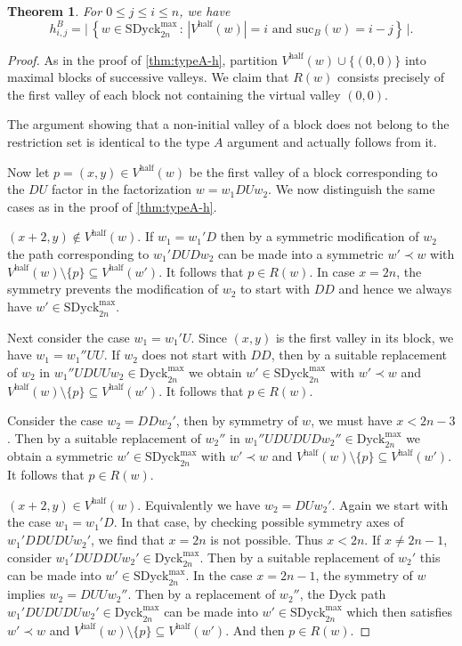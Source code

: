 \documentclass[11pt]{amsart}
\def\Dyck{\mathrm{Dyck}}
\def\half{\mathrm{half}}
\def\SDyck{\mathrm{SDyck}}
\def\suc{\mathrm{suc}}
\theoremstyle{plain}
\numberwithin{lemma}{\DefaultNumberTheoremWithin}
\newtheorem{theorem}{Theorem}
\numberwithin{theorem}{\DefaultNumberTheoremWithin}
\numberwithin{corollary}{\DefaultNumberTheoremWithin}
\numberwithin{proposition}{\DefaultNumberTheoremWithin}
\numberwithin{conjecture}{\DefaultNumberTheoremWithin}
\theoremstyle{definition}
\numberwithin{definition}{\DefaultNumberTheoremWithin}
\numberwithin{question}{\DefaultNumberTheoremWithin}
\numberwithin{problem}{\DefaultNumberTheoremWithin}
\theoremstyle{remark}
\numberwithin{remark}{\DefaultNumberTheoremWithin}
\numberwithin{example}{\DefaultNumberTheoremWithin}
\numberwithin{claim}{\DefaultNumberTheoremWithin}
\begin{document}
\begin{theorem}\label{thm:typeB-h}
For $0\leq j\leq i\leq n$, we have
\[
h^B_{i,j}
=
\Big|\,\left\{
w\in\SDyck_{2n}^{\max}
\,:\,
|V^{\half}(w)|=i \text{ and }
\suc_B(w)=i-j
\right\}\,\Big|.
\]
\end{theorem}

\begin{proof}
As in the proof of
\ref{thm:typeA-h}, partition
$V^{\half}(w)\cup\{(0,0)\}$
into maximal blocks of successive valleys. We claim that $R(w)$
consists precisely of the first valley of each block not containing
the virtual valley $(0,0)$.

The argument showing that a non-initial valley of a block
does not belong to the restriction set is identical to the  type
$A$ argument and actually follows from it. 

Now let $p = (x,y) \in V^ {\half}(w) $ be the first valley of a block corresponding to the $DU$ factor in the factorization 
$w = w_1DUw_2$. 
We now distinguish the same cases as in the proof of \ref{thm:typeA-h}.

\medskip

 $(x+2,y) \not \in V^{\half}(w)$.
If $w_1 = w_1'D$ then by a symmetric modification of $w_2$ the 
path corresponding to $w_1'DUDw_2$ can be made into a symmetric $w' \prec w$ with $V^{\half}(w)\setminus\{p\}
\subseteq V^{\half}(w')$. It follows that $p\in R(w)$. 
In case $x = 2n$, the symmetry prevents the modification of $w_2$ to start with $DD$ and hence we always have $w' \in \SDyck^{\max}_{2n}$. 

Next consider the case $w_1 = w_1'U$. Since $(x,y)$ is the first valley in its block, we have $w_1 = w_1''UU$.
If $w_2$ does not start with $DD$, then 
by a suitable replacement of $w_2$ in 
$w_1''UDUUw_2 \in \Dyck_{2n}^{\max}$ we obtain $w'
\in \SDyck_{2n}^{\max}$ with $w' \prec w$ and $V^{\half}(w)\setminus\{p\}
\subseteq V^{\half}(w')$. It follows that $p\in R(w)$.

Consider the case $w_2 = DDw_2'$, then by symmetry of $w$, we must have $x < 2n-3$. Then by a suitable replacement of $w_2''$ in $w_1''UDUDUDw_2'' \in \Dyck_{2n}^{\max}$ 
we obtain a symmetric $w' \in \SDyck_{2n}^{\max}$
with $w' \prec w$ and $V^{\half}(w)\setminus\{p\}
\subseteq V^{\half}(w')$. It follows that $p\in R(w)$.

\medskip

 $(x+2,y) \in V^{\half}(w)$.
Equivalently we have $w_2 = DUw_2'$.
Again we start with the case $w_1 = w_1'D$. 
In that case, by checking possible symmetry axes of $w_1'DDUDUw_2'$, we find that $x = 2n$ is not possible. 
Thus $x < 2n$. 
If $x \neq 2n-1$, consider
$w_1'DUDDUw_2' \in \Dyck_{2n}^{\max}$. Then by a suitable replacement of $w_2'$ this can be made into
$w' \in \SDyck_{2n}^ {\max}$. 
In the case $x= 2n-1$, the symmetry of $w$ implies $w_2 = DUUw_2''$.
Then by a replacement of $w_2''$, the Dyck path 
$w_1'DUDUDUw_2' \in \Dyck_{2n}^{\max}$ can be made into
$w' \in \SDyck_{2n}^{\max}$ which then satisfies $w' \prec w$ and
$V^{\half}(w)\setminus\{p\}
\subseteq V^{\half}(w')$. And then $p\in R(w)$.


\end{proof}
\end{document}

